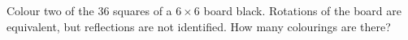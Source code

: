 Colour two of the $36$ squares of a $6\times6$ board black. Rotations of the board are equivalent, but reflections are not identified. How many colourings are there?
